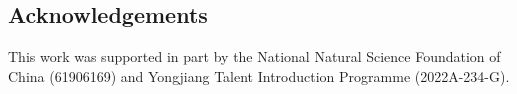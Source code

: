 \documentclass[a0, portrait]{a0poster}
\newcommand{\SAM}{\emph{$SA_M$}\xspace}
\begin{document}
\begin{multicols}{3}
%
%
%


\section*{Acknowledgements}
This work was supported in part by the National Natural Science Foundation of China (61906169) and Yongjiang Talent Introduction Programme (2022A-234-G).





\end{multicols}
\end{document}
